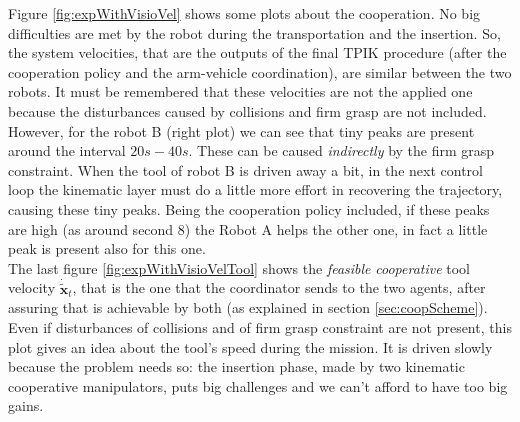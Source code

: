 Figure \ref{fig:expWithVisioVel} shows some plots about the cooperation. No big difficulties are met by the robot during the transportation and the insertion. So, the system velocities, that are the outputs of the final TPIK procedure (after the cooperation policy and the arm-vehicle coordination), are similar between the two robots. It must be remembered that these velocities are not the applied one because the disturbances caused by collisions and firm grasp are not included. However, for the robot B (right plot) we can see that tiny peaks are present around the interval $20s - 40s$. These can be caused \textit{indirectly} by the firm grasp constraint. When the tool of robot B is driven away a bit, in the next control loop the kinematic layer must do a little more effort in recovering the trajectory, causing these tiny peaks. Being the cooperation policy included, if these peaks are high (as around second $8$) the Robot A helps the other one, in fact a little peak is present also for this one.\\
The last figure \ref{fig:expWithVisioVelTool} shows the \textit{feasible} \textit{cooperative} tool velocity $\dot{\tilde{\boldsymbol{x}}}_t$, that is the one that the coordinator sends to the two agents, after assuring that is achievable by both (as explained in section \ref{sec:coopScheme}). Even if disturbances of collisions and of firm grasp constraint are not present, this plot gives an idea about the tool's speed during the mission. It is driven slowly because the problem needs so: the insertion phase, made by two kinematic cooperative manipulators, puts big challenges and we can't afford to have too big gains.\\


